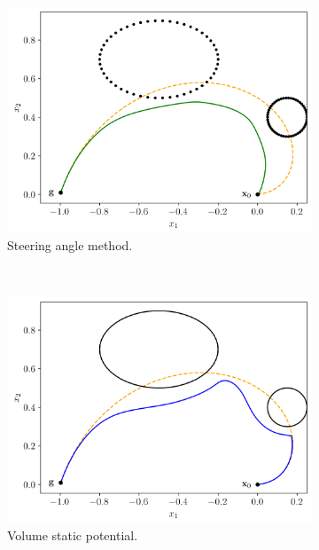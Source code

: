 \documentclass[fleqn, 11pt]{article}
\theoremstyle{definition}
\theoremstyle{plain}
\theoremstyle{remark}
\begin{document}
\begin{figure}[t]
\begin{subfigure}{0.3\linewidth}
        \includegraphics[width=\textwidth]{imgs/two_obst_point_steering.png}
        \caption{Steering angle method.}
    \end{subfigure}
    \\
    \begin{subfigure}{0.45\linewidth}
        \includegraphics[width=\textwidth]{imgs/two_obst_volume_static.png}
        \caption{Volume static potential.}
    \end{subfigure}
    \hfill
    \begin{subfigure}{0.45\linewidth}

\end{subfigure}
\end{figure}
\end{document}
